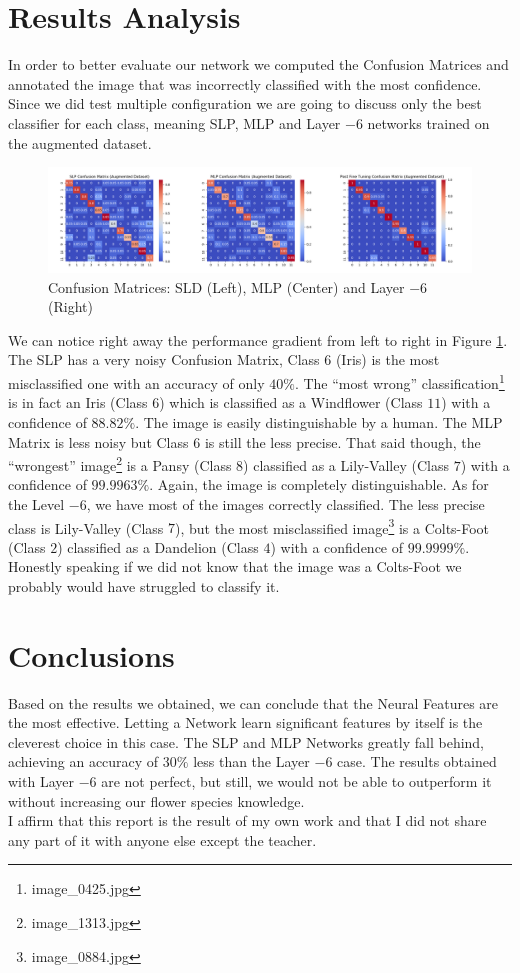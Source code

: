 \documentclass[10pt,a4paper]{report}
\begin{document}
\section{Results Analysis}
In order to better evaluate our network we computed the Confusion Matrices and annotated the image that was incorrectly classified with the most confidence. Since we did test multiple configuration we are going to discuss only the best classifier for each class, meaning SLP, MLP and Layer $-6$ networks trained on the augmented dataset. 
\begin{figure}[!ht]
\centering
\includegraphics[width=\linewidth]{conf_mat.png}
\caption{Confusion Matrices: SLD (Left), MLP (Center) and Layer $-6$ (Right)}
\label{fig:confmat}
\end{figure} 
We can notice right away the performance gradient from left to right in Figure \ref{fig:confmat}. The SLP has a very noisy Confusion Matrix, Class $6$ (Iris) is the most misclassified one with an accuracy of only $40 \%$. The \enquote{most wrong} classification\footnote{image\_0425.jpg} is in fact an Iris (Class $6$) which is classified as a Windflower (Class $11$) with a confidence of $88.82 \%$. The image is easily distinguishable by a human. The MLP Matrix is less noisy but Class $6$ is still the less precise. That said though, the \enquote{wrongest} image\footnote{image\_1313.jpg} is a Pansy (Class $8$) classified as a Lily-Valley (Class $7$) with a confidence of $99.9963 \%$. Again, the image is completely distinguishable. As for the Level $-6$, we have most of the images correctly classified. The less precise class is Lily-Valley (Class $7$), but the most misclassified image\footnote{image\_0884.jpg} is a Colts-Foot (Class $2$) classified as a Dandelion (Class $4$) with a confidence of $99.9999 \%$. Honestly speaking if we did not know that the image was a Colts-Foot we probably would have struggled to classify it. 
\section{Conclusions}
Based on the results we obtained, we can conclude that the Neural Features are the most effective. Letting a Network learn significant features by itself is the cleverest choice in this case. The SLP and MLP Networks greatly fall behind, achieving an accuracy of $30 \%$ less than the Layer $-6$ case. The results obtained with Layer $-6$ are not perfect, but still, we would not be able to outperform it without increasing our flower species knowledge. 
\vspace*{\fill}
\\
I affirm that this report is the result of my own work and that I did not share any part of it with anyone else except the teacher.
\\
\end{document}
